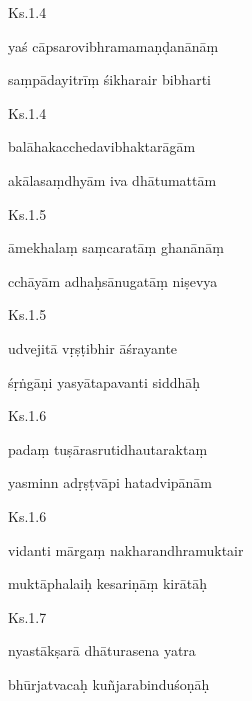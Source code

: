 \documentclass{tufte-handout}
\newenvironment{sanskrit}%
{\begin{otherlanguage}{sanskrit-devanagari}}%
{\end{otherlanguage}}
\begin{document}
    
	\begin{sanskrit}
	
	    
		Ks.1.4 
    
	    
		yaś cāpsarovibhramamaṇḍanānāṃ 
    
	    
		saṃpādayitrīṃ śikharair bibharti 
    
	\end{sanskrit}

    
	\begin{sanskrit}
	
	    
		Ks.1.4 
    
	    
		balāhakacchedavibhaktarāgām 
    
	    
		akālasaṃdhyām iva dhātumattām 
    
	\end{sanskrit}

    
	\begin{sanskrit}
	
	    
		Ks.1.5 
    
	    
		āmekhalaṃ saṃcaratāṃ ghanānāṃ 
    
	    
		cchāyām adhaḥsānugatāṃ niṣevya 
    
	\end{sanskrit}

    
	\begin{sanskrit}
	
	    
		Ks.1.5 
    
	    
		udvejitā vṛṣṭibhir āśrayante 
    
	    
		śṛṅgāṇi yasyātapavanti siddhāḥ 
    
	\end{sanskrit}

    
	\begin{sanskrit}
	
	    
		Ks.1.6 
    
	    
		padaṃ tuṣārasrutidhautaraktaṃ 
    
	    
		yasminn adṛṣṭvāpi hatadvipānām 
    
	\end{sanskrit}

    
	\begin{sanskrit}
	
	    
		Ks.1.6 
    
	    
		vidanti mārgaṃ nakharandhramuktair 
    
	    
		muktāphalaiḥ kesariṇāṃ kirātāḥ 
    
	\end{sanskrit}

    
	\begin{sanskrit}
	
	    
		Ks.1.7 
    
	    
		nyastākṣarā dhāturasena yatra 
    
	    
		bhūrjatvacaḥ kuñjarabinduśoṇāḥ 
    
	\end{sanskrit}
\end{document}
